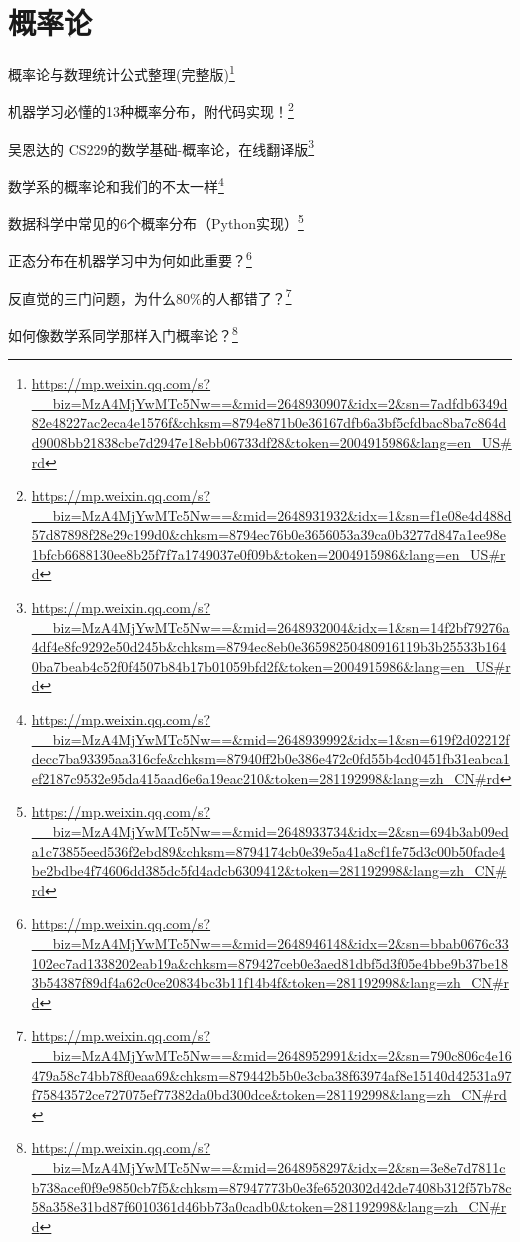 \documentclass[]{ctexbook}
\renewcommand{\href}[2]{#2\footnote{\url{#1}}}
\begin{document}
\hypertarget{ux6982ux7387ux8bba}{%
\section{概率论}\label{ux6982ux7387ux8bba}}

\href{https://mp.weixin.qq.com/s?__biz=MzA4MjYwMTc5Nw==\&mid=2648930907\&idx=2\&sn=7adfdb6349d82e48227ac2eca4e1576f\&chksm=8794e871b0e36167dfb6a3bf5cfdbac8ba7c864dd9008bb21838cbe7d2947e18ebb06733df28\&token=2004915986\&lang=en_US\#rd}{概率论与数理统计公式整理(完整版)}

\href{https://mp.weixin.qq.com/s?__biz=MzA4MjYwMTc5Nw==\&mid=2648931932\&idx=1\&sn=f1e08e4d488d57d87898f28e29c199d0\&chksm=8794ec76b0e3656053a39ca0b3277d847a1ee98e1bfcb6688130ee8b25f7f7a1749037e0f09b\&token=2004915986\&lang=en_US\#rd}{机器学习必懂的13种概率分布，附代码实现！}

\href{https://mp.weixin.qq.com/s?__biz=MzA4MjYwMTc5Nw==\&mid=2648932004\&idx=1\&sn=14f2bf79276a4df4e8fc9292e50d245b\&chksm=8794ec8eb0e36598250480916119b3b25533b1640ba7beab4c52f0f4507b84b17b01059bfd2f\&token=2004915986\&lang=en_US\#rd}{吴恩达的 CS229的数学基础-概率论，在线翻译版}

\href{https://mp.weixin.qq.com/s?__biz=MzA4MjYwMTc5Nw==\&mid=2648939992\&idx=1\&sn=619f2d02212fdecc7ba93395aa316cfe\&chksm=87940ff2b0e386e472c0fd55b4cd0451fb31eabca1ef2187c9532e95da415aad6e6a19eac210\&token=281192998\&lang=zh_CN\#rd}{数学系的概率论和我们的不太一样}

\href{https://mp.weixin.qq.com/s?__biz=MzA4MjYwMTc5Nw==\&mid=2648933734\&idx=2\&sn=694b3ab09eda1c73855eed536f2ebd89\&chksm=8794174cb0e39e5a41a8cf1fe75d3c00b50fade4be2bdbe4f74606dd385dc5fd4adcb6309412\&token=281192998\&lang=zh_CN\#rd}{数据科学中常见的6个概率分布（Python实现）}

\href{https://mp.weixin.qq.com/s?__biz=MzA4MjYwMTc5Nw==\&mid=2648946148\&idx=2\&sn=bbab0676c33102ec7ad1338202eab19a\&chksm=879427ceb0e3aed81dbf5d3f05e4bbe9b37be183b54387f89df4a62c0ce20834bc3b11f14b4f\&token=281192998\&lang=zh_CN\#rd}{正态分布在机器学习中为何如此重要？}

\href{https://mp.weixin.qq.com/s?__biz=MzA4MjYwMTc5Nw==\&mid=2648952991\&idx=2\&sn=790c806c4e16479a58c74bb78f0eaa69\&chksm=879442b5b0e3cba38f63974af8e15140d42531a97f75843572ce727075ef77382da0bd300dce\&token=281192998\&lang=zh_CN\#rd}{反直觉的三门问题，为什么80\%的人都错了？}

\href{https://mp.weixin.qq.com/s?__biz=MzA4MjYwMTc5Nw==\&mid=2648958297\&idx=2\&sn=3e8e7d7811cb738acef0f9e9850cb7f5\&chksm=87947773b0e3fe6520302d42de7408b312f57b78c58a358e31bd87f6010361d46bb73a0cadb0\&token=281192998\&lang=zh_CN\#rd}{如何像数学系同学那样入门概率论？}
\end{document}
